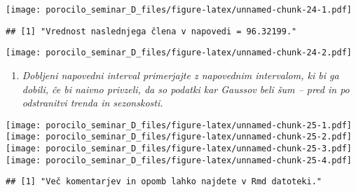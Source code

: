 \documentclass[
]{article}
\providecommand{\tightlist}{%
  \setlength{\itemsep}{0pt}\setlength{\parskip}{0pt}}
\begin{document}
\texttt{[image: porocilo\_seminar\_D\_files/figure-latex/unnamed-chunk-24-1.pdf]}

\begin{verbatim}
## [1] "Vrednost naslednjega člena v napovedi = 96.32199."
\end{verbatim}

\texttt{[image: porocilo\_seminar\_D\_files/figure-latex/unnamed-chunk-24-2.pdf]}

\begin{enumerate}
\def\labelenumi{\arabic{enumi}.}
\setcounter{enumi}{8}
\tightlist
\item
  \emph{Dobljeni napovedni interval primerjajte z napovednim intervalom,
  ki bi ga dobili, če bi naivno privzeli, da so podatki kar Gaussov beli
  šum -- pred in po odstranitvi trenda in sezonskosti.}
\end{enumerate}

\texttt{[image: porocilo\_seminar\_D\_files/figure-latex/unnamed-chunk-25-1.pdf]}
\texttt{[image: porocilo\_seminar\_D\_files/figure-latex/unnamed-chunk-25-2.pdf]}
\texttt{[image: porocilo\_seminar\_D\_files/figure-latex/unnamed-chunk-25-3.pdf]}
\texttt{[image: porocilo\_seminar\_D\_files/figure-latex/unnamed-chunk-25-4.pdf]}

\begin{verbatim}
## [1] "Več komentarjev in opomb lahko najdete v Rmd datoteki."
\end{verbatim}
\end{document}
